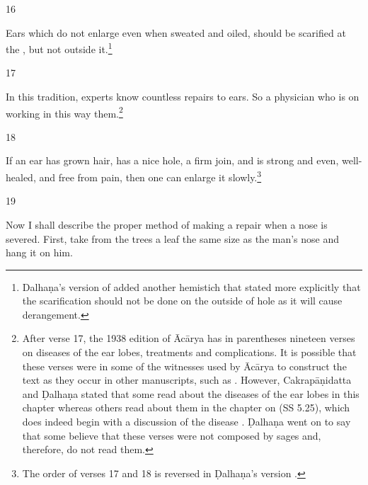 \begin{translation}
\item[16]
        \begin{em}
Ears which do not enlarge even when sweated and oiled,  should be scarified  at the
, but not outside it.\footnote{Dalhaṇa's version of
     added another hemistich that stated more explicitly that the
    scarification should not be done on the outside of hole as it will cause
    derangement.}
        \end{em}
    
\item[17]
          \begin{em}
    In this tradition, experts know countless repairs to ears.  So a physician
who is  on working in this way
 them.\footnote{After verse 17, the 1938
    edition of Ācārya \citep[80]{vulgate} has in parentheses nineteen verses
    on diseases of the ear lobes,  treatments and complications. It is
    possible that these verses were in some of the witnesses used by Ācārya to
    construct the text as they occur in other manuscripts, such as 
    . However, Cakrapāṇidatta
    \citep[132]{acar-1939} and Ḍalhaṇa \citep[80]{vulgate} stated that some
    read about the diseases of the ear lobes in this chapter whereas others
    read about them in the chapter on 
    (SS 5.25), which does indeed begin with a discussion of the disease
    .  Ḍalhaṇa went on to say that some believe that these
    verses were not composed by sages and, therefore, do not read them.}
        \end{em}
    
\item[18]
           \begin{em}
    If an ear has grown hair, has a nice hole, a firm join, and is strong and
even, well-healed, and free from pain, then one can enlarge it
slowly.\footnote{The order of verses 17 and 18 is reversed in Ḍalhaṇa's
    version \citep[80]{vulgate}.}
        \end{em}
    
\item[19]
    
   \begin{em}
        Now I shall describe the proper method of making a repair when a nose
is severed. First, take from the trees a leaf the same size as the
man's nose and hang it on him.
   \end{em}
    

\end{translation}
